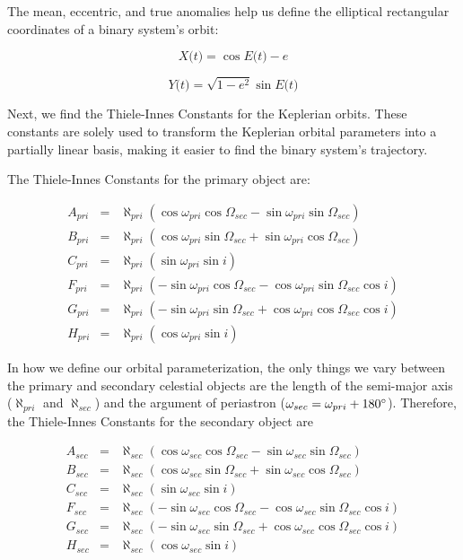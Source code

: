 \documentclass[twocolumn]{aastex701}
\newcommand{\w}{\omega_{pri}}
\newcommand{\wsec}{\omega_{sec}}
\newcommand{\bigomega}{\Omega_{sec}}
\newcommand{\inclination}{\textit{i}}
\newcommand{\eccentricity}{\textit{e}}
\newcommand{\al}{\aleph_{pri}}
\newcommand{\ala}{\aleph_{sec}}
\newcommand{\E}{\textit{E(t)}}
\newcommand{\Apri}{A_{pri}}
\newcommand{\Asec}{A_{sec}}
\newcommand{\Bpri}{B_{pri}}
\newcommand{\Bsec}{B_{sec}}
\newcommand{\Cpri}{C_{pri}}
\newcommand{\Csec}{C_{sec}}
\newcommand{\Fpri}{F_{pri}}
\newcommand{\Fsec}{F_{sec}}
\newcommand{\Gpri}{G_{pri}}
\newcommand{\Gsec}{G_{sec}}
\newcommand{\Hpri}{H_{pri}}
\newcommand{\Hsec}{H_{sec}}
\begin{document}
The mean, eccentric, and true anomalies help us define the elliptical rectangular coordinates of a binary system's orbit: 

\begin{equation}
    \label{ell_rec_coord1}
    \textit{X(t)} = \cos \E - \eccentricity 
\end{equation}

\begin{equation}
    \label{ell_rec_coord2}
    \textit{Y(t)} =  \sqrt{1 - \eccentricity^2} \sin \E
\end{equation}

Next, we find the Thiele-Innes Constants for the Keplerian orbits. These constants are solely used to transform the Keplerian orbital parameters into a partially linear basis, making it easier to find the binary system's trajectory.

The Thiele-Innes Constants for the primary object are:

\begin{eqnarray}
    \Apri &=& \al \left(\cos \w \cos \bigomega - \sin \w \sin \bigomega \right) \nonumber \\
    \Bpri &=& \al \left(\cos \w \sin \bigomega + \sin \w \cos \bigomega \right) \nonumber  \\
    \Cpri &=& \al \left(\sin \w \sin \inclination\right) \nonumber \\
    \Fpri &=& \al \left(-\sin \w \cos \bigomega - \cos \w \sin \bigomega \cos \inclination \right) \nonumber \\
    \Gpri &=& \al \left(-\sin \w \sin \bigomega + \cos \w \cos \bigomega \cos \inclination \right) \nonumber \\
    \Hpri &=& \al \left(\cos \w \sin \inclination \right) 
\end{eqnarray}

In how we define our orbital parameterization, the only things we vary between the primary and secondary celestial objects are the length of the semi-major axis ($\al$ and $\ala$) and the argument of periastron ($\wsec = \w + 180 \degree$). Therefore, the Thiele-Innes Constants for the secondary object are

\begin{eqnarray}
    \Asec &=& \ala \left(\cos \wsec \cos \bigomega - \sin\wsec  \sin \bigomega \right) \nonumber \\
    \Bsec &=& \ala \left(\cos\wsec  \sin \bigomega + \sin\wsec  \cos \bigomega \right) \nonumber \\
    \Csec &=& \ala \left(\sin\wsec  \sin \inclination\right) \nonumber \\
    \Fsec &=& \ala \left(-\sin\wsec  \cos \bigomega - \cos\wsec  \sin \bigomega \cos \inclination \right) \nonumber  \\
    \Gsec &=& \ala \left(-\sin \wsec  \sin \bigomega + \cos\wsec  \cos \bigomega \cos \inclination \right) \nonumber  \\
    \Hsec &=& \ala \left(\cos \wsec \sin \inclination \right) 
\end{eqnarray}
\end{document}
